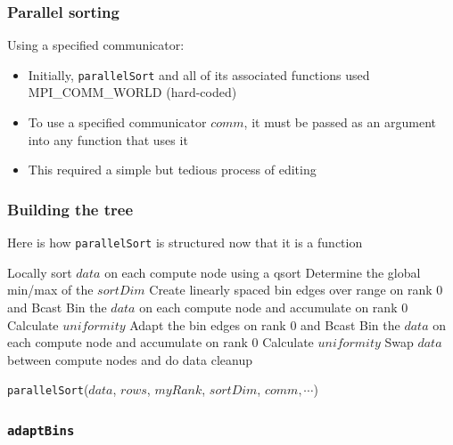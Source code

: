 \documentclass[usernames,dvipsnames]{beamer}
\begin{document}
\begin{frame}
	\frametitle{Parallel sorting}
	
	\begin{block}{Using a specified communicator:}
		\begin{itemize}
			\item Initially, \texttt{parallelSort} and all of its associated functions used MPI\_COMM\_WORLD (hard-coded)
			\item To use a specified communicator $comm$, it must be passed as an argument into any function that uses it
			\item This required a simple but tedious process of editing
		\end{itemize}
	\end{block}
\end{frame}

\begin{frame}
	\frametitle{Building the tree}
	
	Here is how \texttt{parallelSort} is structured now that it is a function
	
	\vspace{10pt}
	
	\begin{algorithm}[H]
		\begin{algorithmic}[1]
			\STATE Locally sort $data$ on each compute node using a qsort
			\STATE Determine the global min/max of the $sortDim$
			\STATE Create linearly spaced bin edges over range on rank 0 and Bcast
			\STATE Bin the $data$ on each compute node and accumulate on rank 0
			\STATE Calculate $uniformity$
				\STATE Adapt the bin edges on rank 0 and Bcast
				\STATE Bin the $data$ on each compute node and accumulate on rank 0
				\STATE Calculate $uniformity$
			\ENDWHILE
			\STATE Swap $data$ between compute nodes and do data cleanup
		\end{algorithmic}
		\caption{\texttt{parallelSort}($data$, $rows$, $myRank$, $sortDim$, $comm, \cdots$)}
	\end{algorithm}
		
\end{frame}


\subsubsection{\texttt{adaptBins}}
\end{document}
